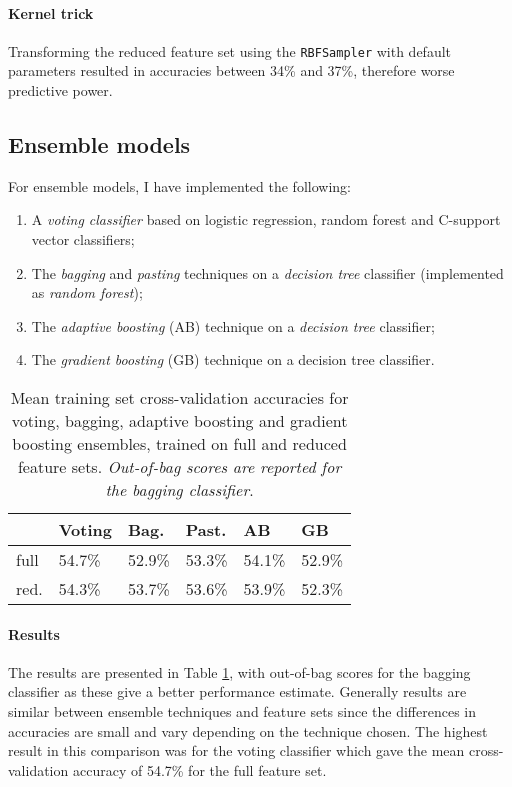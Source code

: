 \documentclass[10pt, twocolumn]{article}
\begin{document}
\paragraph{Kernel trick} Transforming the reduced feature set using the \texttt{RBFSampler} with default parameters resulted in accuracies between 34\% and 37\%, therefore worse predictive power.

\subsection{Ensemble models}
For ensemble models, I have implemented the following: 
\begin{enumerate}[label=(\textit{\roman*})]
	\item A \textit{voting classifier} based on logistic regression, random forest and C-support vector classifiers;
	\item The \textit{bagging} and \textit{pasting} techniques on a \textit{decision tree} classifier (implemented as \textit{random forest});
	\item The \textit{adaptive boosting} (AB) technique on a \textit{decision tree} classifier;
	\item The \textit{gradient boosting} (GB) technique on a decision tree classifier.
\end{enumerate}

\begin{table}[]
	\begin{tabularx}{\linewidth}{XXXXXX}
		\hline
			& \textbf{Voting} & \textbf{Bag.} &\textbf{Past.} & \textbf{AB} & \textbf{GB} \\ \hline
	full   & 54.7\%  & 52.9\% & 53.3\% & 54.1\% & 52.9\% \\
	red. & 54.3\% & 53.7\% & 53.6\% & 53.9\% & 52.3\% \\ 
	\hline
	\end{tabularx}
	\caption{Mean training set cross-validation accuracies for voting, bagging, adaptive boosting and gradient boosting ensembles, trained on full and reduced feature sets. \textit{Out-of-bag scores are reported for the bagging classifier}.}\label{ensemble}
\end{table}

\paragraph{Results} The results are presented in Table \ref{ensemble}, with out-of-bag scores for the bagging classifier as these give a better performance estimate. Generally results are similar between ensemble techniques and feature sets since the differences in accuracies are small and vary depending on the technique chosen. The highest result in this comparison was for the voting classifier which gave the mean cross-validation accuracy of 54.7\% for the full feature set.
\end{document}
